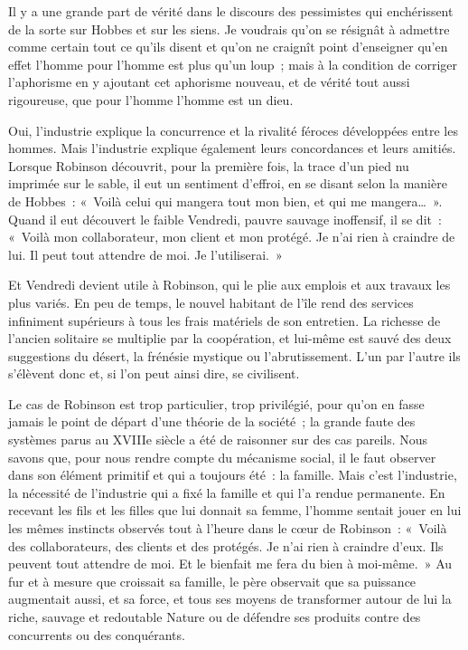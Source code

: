 \documentclass[french,twoside]{book} %
\begin{document}
\noindent Il y a une grande part de vérité dans le discours des pessimistes qui enchérissent de la sorte sur Hobbes et sur les siens. Je voudrais qu’on se résignât à admettre comme certain tout ce qu’ils disent et qu’on ne craignît point d’enseigner qu’en effet l’homme pour l’homme est plus qu’un loup ; mais à la condition de corriger l’aphorisme en y ajoutant cet aphorisme nouveau, et de vérité tout aussi rigoureuse, que pour l’homme l’homme est un dieu.\par
Oui, l’industrie explique la concurrence et la rivalité féroces développées entre les hommes. Mais l’industrie explique également leurs concordances et leurs amitiés. Lorsque Robinson découvrit, pour la première fois, la trace d’un pied nu imprimée sur le sable, il eut un sentiment d’effroi, en se disant selon la manière de Hobbes : « Voilà celui qui mangera tout mon bien, et qui me mangera… ». Quand il eut découvert le faible Vendredi, pauvre sauvage inoffensif, il se dit : « Voilà mon collaborateur, mon client et mon protégé. Je n’ai rien à craindre de lui. Il peut tout attendre de moi. Je l’utiliserai. »\par
Et Vendredi devient utile à Robinson, qui le plie aux emplois et aux travaux les plus variés. En peu de temps, le nouvel habitant de l’île rend des services infiniment supérieurs à tous les frais matériels de son entretien. La richesse de l’ancien solitaire se multiplie par la coopération, et lui-même est sauvé des deux suggestions du désert, la frénésie mystique ou l’abrutissement. L’un par l’autre ils s’élèvent donc et, si l’on peut ainsi dire, se civilisent.\par
Le cas de Robinson est trop particulier, trop privilégié, pour qu’on en fasse jamais le point de départ d’une théorie de la société ; la grande faute des systèmes parus au XVIIIe siècle a été de raisonner sur des cas pareils. Nous savons que, pour nous rendre compte du mécanisme social, il le faut observer dans son élément primitif et qui a toujours été : la famille. Mais c’est l’industrie, la nécessité de l’industrie qui a fixé la famille et qui l’a rendue permanente. En recevant les fils et les filles que lui donnait sa femme, l’homme sentait jouer en lui les mêmes instincts observés tout à l’heure dans le cœur de Robinson : « Voilà des collaborateurs, des clients et des protégés. Je n’ai rien à craindre d’eux. Ils peuvent tout attendre de moi. Et le bienfait me fera du bien à moi-même. » Au fur et à mesure que croissait sa famille, le père observait que sa puissance augmentait aussi, et sa force, et tous ses moyens de transformer autour de lui la riche, sauvage et redoutable Nature ou de défendre ses produits contre des concurrents ou des conquérants.\par
\end{document}

